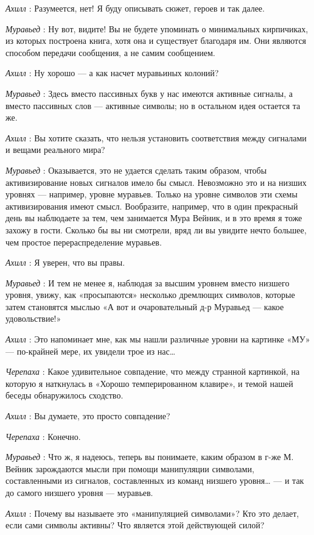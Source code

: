 \documentclass[../main.tex]{subfiles}
\begin{document}
\begin{dialogue}
\emph{Ахилл} : Разумеется, нет! Я буду описывать сюжет, героев и так далее.

\emph{Муравьед} : Ну вот, видите! Вы не будете упоминать о минимальных кирпичиках, из которых построена книга, хотя она и существует благодаря им. Они являются способом передачи сообщения, а не самим сообщением.

\emph{Ахилл} : Ну хорошо --- а как насчет муравьиных колоний?

\emph{Муравьед} : Здесь вместо пассивных букв у нас имеются активные сигналы, а вместо пассивных слов --- активные символы; но в остальном идея остается та же.

\emph{Ахилл} : Вы хотите сказать, что нельзя установить соответствия между сигналами и вещами реального мира?

\emph{Муравьед} : Оказывается, это не удается сделать таким образом, чтобы активизирование новых сигналов имело бы смысл. Невозможно это и на низших уровнях --- например, уровне муравьев. Только на уровне символов эти схемы активизирования имеют смысл. Вообразите, например, что в один прекрасный день вы наблюдаете за тем, чем занимается Мура Вейник, и в это время я тоже захожу в гости. Сколько бы вы ни смотрели, вряд ли вы увидите нечто большее, чем простое перераспределение муравьев.

\emph{Ахилл} : Я уверен, что вы правы.

\emph{Муравьед} : И тем не менее я, наблюдая за высшим уровнем вместо низшего уровня, увижу, как «просыпаются» несколько дремлющих символов, которые затем становятся мыслью «А вот и очаровательный д-р Муравьед --- какое удовольствие!»

\emph{Ахилл} : Это напоминает мне, как мы нашли различные уровни на картинке «МУ» --- по-крайней мере, их увидели трое из нас\ldots{}

\emph{Черепаха} : Какое удивительное совпадение, что между странной картинкой, на которую я наткнулась в «Хорошо темперированном клавире», и темой нашей беседы обнаружилось сходство.

\emph{Ахилл} : Вы думаете, это просто совпадение?

\emph{Черепаха} : Конечно.

\emph{Муравьед} : Что ж, я надеюсь, теперь вы понимаете, каким образом в г-же М. Вейник зарождаются мысли при помощи манипуляции символами, составленными из сигналов, составленных из команд низшего уровня\ldots{} --- и так до самого низшего уровня --- муравьев.

\emph{Ахилл} : Почему вы называете это «манипуляцией символами»? Кто это делает, если сами символы активны? Что является этой действующей силой?


\end{dialogue}
\end{document}
